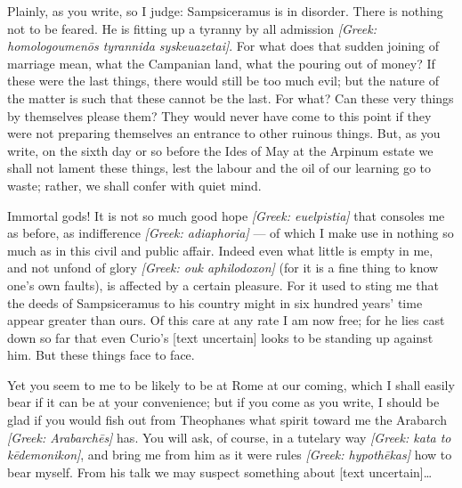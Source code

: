 

 Plainly, as you write, so I judge: Sampsiceramus is in disorder. There is nothing not to be feared. He is fitting up a tyranny by all admission \textit{[Greek: homologoumen\=os tyrannida syskeuazetai]}. For what does that sudden joining of marriage mean, what the Campanian land, what the pouring out of money? If these were the last things, there would still be too much evil; but the nature of the matter is such that these cannot be the last. For what? Can these very things by themselves please them? They would never have come to this point if they were not preparing themselves an entrance to other ruinous things. But, as you write, on the sixth day or so before the Ides of May at the Arpinum estate we shall not lament these things, lest the labour and the oil of our learning go to waste; rather, we shall confer with quiet mind.

 Immortal gods! It is not so much good hope \textit{[Greek: euelpistia]} that consoles me as before, as indifference \textit{[Greek: adiaphoria]} --- of which I make use in nothing so much as in this civil and public affair. Indeed even what little is empty in me, and not unfond of glory \textit{[Greek: ouk aphilodoxon]} (for it is a fine thing to know one's own faults), is affected by a certain pleasure. For it used to sting me that the deeds of Sampsiceramus to his country might in six hundred years' time appear greater than ours. Of this care at any rate I am now free; for he lies cast down so far that even Curio's [text uncertain] looks to be standing up against him. But these things face to face.

 Yet you seem to me to be likely to be at Rome at our coming, which I shall easily bear if it can be at your convenience; but if you come as you write, I should be glad if you would fish out from Theophanes what spirit toward me the Arabarch \textit{[Greek: Arabarch\=es]} has. You will ask, of course, in a tutelary way \textit{[Greek: kata to k\=edemonikon]}, and bring me from him as it were rules \textit{[Greek: hypoth\=ekas]} how to bear myself. From his talk we may suspect something about [text uncertain]\ldots
